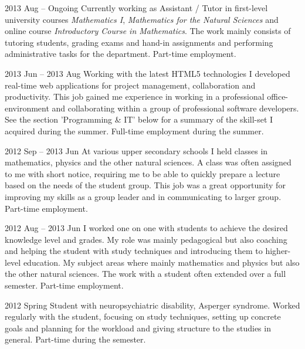 
      {2013 Aug -- Ongoing}
      {Currently working as Assistant / Tutor in first-level
       university courses \emph{Mathematics I}, \emph{Mathematics for the Natural Sciences}
       and online course \emph{Introductory Course in Mathematics}.
       The work mainly consists of tutoring students, grading exams and hand-in assignments and
       performing administrative tasks for the department. Part-time employment.}

      {2013 Jun -- 2013 Aug}
      {Working with the latest HTML5 technologies I developed real-time
       web applications for project management, collaboration and productivity.
       This job gained me experience in working in a professional office-environment
       and collaborating within a group of professional software developers.
       See the section 'Programming \& IT' below for a summary of the skill-set I acquired during the summer.
       Full-time employment during the summer.}

      {2012 Sep -- 2013 Jun}
      {At various upper secondary schools I held classes in
       mathematics, physics and the other natural sciences.
       A class was often assigned to me with
       short notice, requiring me to be able to quickly prepare a lecture
       based on the needs of the student group. This job was a great
       opportunity for improving my skills as a group leader and in
       communicating to larger group. Part-time employment.}

      {2012 Aug -- 2013 Jun}
      {I worked one on one with students to achieve the desired knowledge level and
       grades. My role was mainly pedagogical but also coaching and helping
       the student with study techniques and introducing them to higher-level
       education. My subject areas where mainly mathematics and physics but also the
       other natural sciences. The work with a student often extended over a full semester.
       Part-time employment.}

      {2012 Spring}
      {Student with neuropsychiatric disability, Asperger syndrome.
       Worked regularly with the student, focusing on study techniques,
       setting up concrete goals and planning for the workload and giving
       structure to the studies in general. Part-time during the semester.}
